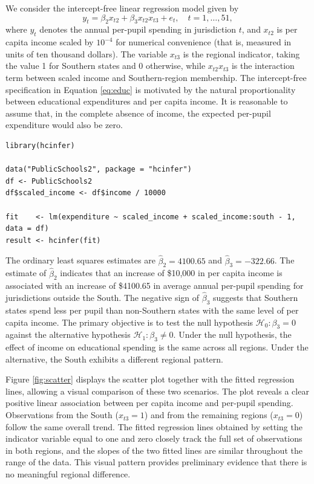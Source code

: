 We consider the intercept-free linear regression model given by
\begin{equation}
y_t = \beta_2 x_{t2} + \beta_3 x_{t2} x_{t3} + e_t, \quad t = 1, \ldots, 51,
\label{eq:educ}
\end{equation}
where \(y_t\) denotes the annual per-pupil spending in jurisdiction \(t\), and \(x_{t2}\) is per capita income scaled by \(10^{-4}\) for numerical convenience (that is, measured in units of ten thousand dollars). The variable \(x_{t3}\) is the regional indicator, taking the value 1 for Southern states and 0 otherwise, while \(x_{t2}x_{t3}\) is the interaction term between scaled income and Southern-region membership. The intercept-free specification in Equation \eqref{eq:educ} is motivated by the natural proportionality between educational expenditures and per capita income. It is reasonable to assume that, in the complete absence of income, the expected per-pupil expenditure would also be zero.

\begin{verbatim}
library(hcinfer)

data("PublicSchools2", package = "hcinfer")
df <- PublicSchools2
df$scaled_income <- df$income / 10000

fit    <- lm(expenditure ~ scaled_income + scaled_income:south - 1, data = df)
result <- hcinfer(fit)
\end{verbatim}

The ordinary least squares estimates are \(\hat{\beta}_2 = 4100.65\) and \(\hat{\beta}_3 = -322.66\). The estimate of \(\hat{\beta}_2\) indicates that an increase of \$10,000 in per capita income is associated with an increase of \$4100.65 in average annual per-pupil spending for jurisdictions outside the South. The negative sign of \(\hat{\beta}_3\) suggests that Southern states spend less per pupil than non-Southern states with the same level of per capita income. The primary objective is to test the null hypothesis \(\mathcal{H}_0 \colon \beta_3 = 0\) against the alternative hypothesis \(\mathcal{H}_1 \colon \beta_3 \neq 0\). Under the null hypothesis, the effect of income on educational spending is the same across all regions. Under the alternative, the South exhibits a different regional pattern.

Figure \ref{fig:scatter} displays the scatter plot together with the fitted regression lines, allowing a visual comparison of these two scenarios. The plot reveals a clear positive linear association between per capita income and per-pupil spending. Observations from the South (\(x_{t3}=1\)) and from the remaining regions (\(x_{t3}=0\)) follow the same overall trend. The fitted regression lines obtained by setting the indicator variable equal to one and zero closely track the full set of observations in both regions, and the slopes of the two fitted lines are similar throughout the range of the data. This visual pattern provides preliminary evidence that there is no meaningful regional difference.

